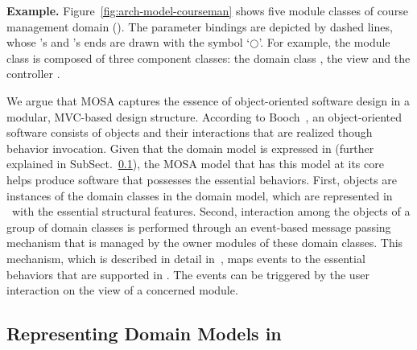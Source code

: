 %
\noindent \textbf{Example.} Figure~\ref{fig:arch-model-courseman} shows five module classes of course management domain (\courseman). The parameter bindings are depicted by dashed lines, whose 's and 's ends are drawn with the symbol `$\bigcirc$'. 
%
For example, the module class  is composed of three component classes: the domain class , the view  and the controller .

We argue that MOSA captures the essence of object-oriented software design in a modular, MVC-based design structure. According to Booch~\cite{booch_object-oriented_1986}, an object-oriented software consists of objects and their interactions that are realized though behavior invocation. Given that the domain model is expressed in \dcsl (further explained in SubSect.~\ref{sect:bg-dcsl}), the MOSA model that has this model at its core helps produce software that possesses the essential behaviors. First, objects are instances of the domain classes in the domain model, which are represented in \dcsl~with the essential structural features. Second, interaction among the objects of a group of domain classes is performed through an event-based message passing mechanism that is managed by the owner modules of these domain classes. This mechanism, which is described in detail in~\cite{le_jdomainapp_2017}, maps events to the essential behaviors that are supported in \dcsl. The events can be triggered by the user interaction on the view of a concerned module. %
%

\subsection{Representing Domain Models in \dcsl}
\label{sect:bg-dcsl}

